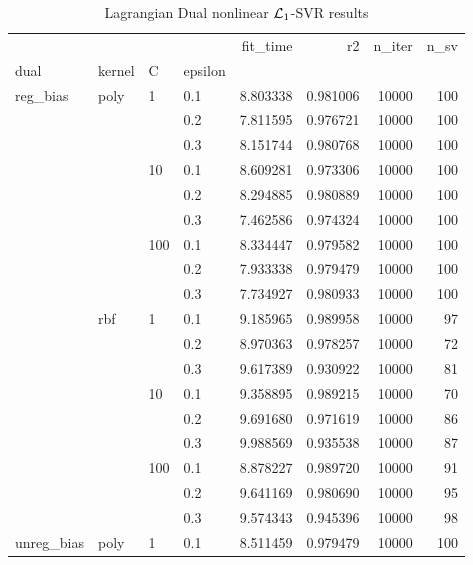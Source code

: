\begin{table}[H]
\centering
\caption{Lagrangian Dual nonlinear $\protect \mathcal{L}_1$-SVR results}
\label{nonlinear_lagrangian_dual_l1_svr_cv_results}
\begin{tabular}{llllrrrr}
\toprule
           &     &     &     &   fit\_time &        r2 &  n\_iter &  n\_sv \\
dual & kernel & C & epsilon &            &           &         &       \\
\midrule
reg\_bias & poly & 1   & 0.1 &   8.803338 &  0.981006 &   10000 &   100 \\
           &     &     & 0.2 &   7.811595 &  0.976721 &   10000 &   100 \\
           &     &     & 0.3 &   8.151744 &  0.980768 &   10000 &   100 \\
           &     & 10  & 0.1 &   8.609281 &  0.973306 &   10000 &   100 \\
           &     &     & 0.2 &   8.294885 &  0.980889 &   10000 &   100 \\
           &     &     & 0.3 &   7.462586 &  0.974324 &   10000 &   100 \\
           &     & 100 & 0.1 &   8.334447 &  0.979582 &   10000 &   100 \\
           &     &     & 0.2 &   7.933338 &  0.979479 &   10000 &   100 \\
           &     &     & 0.3 &   7.734927 &  0.980933 &   10000 &   100 \\
           & rbf & 1   & 0.1 &   9.185965 &  0.989958 &   10000 &    97 \\
           &     &     & 0.2 &   8.970363 &  0.978257 &   10000 &    72 \\
           &     &     & 0.3 &   9.617389 &  0.930922 &   10000 &    81 \\
           &     & 10  & 0.1 &   9.358895 &  0.989215 &   10000 &    70 \\
           &     &     & 0.2 &   9.691680 &  0.971619 &   10000 &    86 \\
           &     &     & 0.3 &   9.988569 &  0.935538 &   10000 &    87 \\
           &     & 100 & 0.1 &   8.878227 &  0.989720 &   10000 &    91 \\
           &     &     & 0.2 &   9.641169 &  0.980690 &   10000 &    95 \\
           &     &     & 0.3 &   9.574343 &  0.945396 &   10000 &    98 \\
unreg\_bias & poly & 1   & 0.1 &   8.511459 &  0.979479 &   10000 &   100 \\

\end{tabular}
\end{table}
